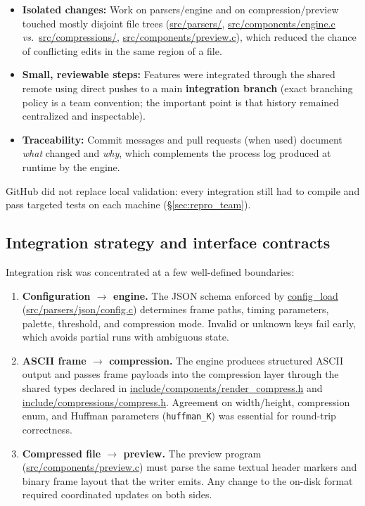 \begin{itemize}
    \item \textbf{Isolated changes:} Work on parsers/engine and on compression/preview touched mostly disjoint file trees (\url{src/parsers/}, \url{src/components/engine.c} \emph{vs.}\ \url{src/compressions/}, \url{src/components/preview.c}), which reduced the chance of conflicting edits in the same region of a file.
    \item \textbf{Small, reviewable steps:} Features were integrated through the shared remote using direct pushes to a main \textbf{integration branch} (exact branching policy is a team convention; the important point is that history remained centralized and inspectable).
    \item \textbf{Traceability:} Commit messages and pull requests (when used) document \emph{what} changed and \emph{why}, which complements the process log produced at runtime by the engine.
\end{itemize}

GitHub did not replace local validation: every integration still had to compile and pass targeted tests on each machine (\S\ref{sec:repro_team}).

\subsection{Integration strategy and interface contracts}
Integration risk was concentrated at a few well-defined boundaries:

\begin{enumerate}[label=\arabic*)]
    \item \textbf{Configuration $\rightarrow$ engine.} The JSON schema enforced by \url{config_load} (\url{src/parsers/json/config.c}) determines frame paths, timing parameters, palette, threshold, and compression mode. Invalid or unknown keys fail early, which avoids partial runs with ambiguous state.
    \item \textbf{ASCII frame $\rightarrow$ compression.} The engine produces structured ASCII output and passes frame payloads into the compression layer through the shared types declared in \url{include/components/render_compress.h} and \url{include/compressions/compress.h}. Agreement on width/height, compression enum, and Huffman parameters (\texttt{huffman\_K}) was essential for round-trip correctness.
    \item \textbf{Compressed file $\rightarrow$ preview.} The preview program (\url{src/components/preview.c}) must parse the same textual header markers and binary frame layout that the writer emits. Any change to the on-disk format required coordinated updates on both sides.
\end{enumerate}

